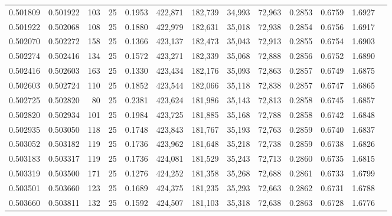 \begin{tabular}{rrrrrrrrrrrrr}
0.501809 & 0.501922 &   103 &  25 &                                     0.1953 & 422,871 & 182,739 &  34,993 &  72,963 & 0.2853 & 0.6759 & 1.6927 \\
0.501922 & 0.502068 &   108 &  25 &                                     0.1880 & 422,979 & 182,631 &  35,018 &  72,938 & 0.2854 & 0.6756 & 1.6917 \\
0.502070 & 0.502272 &   158 &  25 &                                     0.1366 & 423,137 & 182,473 &  35,043 &  72,913 & 0.2855 & 0.6754 & 1.6903 \\
0.502274 & 0.502416 &   134 &  25 &                                     0.1572 & 423,271 & 182,339 &  35,068 &  72,888 & 0.2856 & 0.6752 & 1.6890 \\
0.502416 & 0.502603 &   163 &  25 &                                     0.1330 & 423,434 & 182,176 &  35,093 &  72,863 & 0.2857 & 0.6749 & 1.6875 \\
0.502603 & 0.502724 &   110 &  25 &                                     0.1852 & 423,544 & 182,066 &  35,118 &  72,838 & 0.2857 & 0.6747 & 1.6865 \\
0.502725 & 0.502820 &    80 &  25 &                                     0.2381 & 423,624 & 181,986 &  35,143 &  72,813 & 0.2858 & 0.6745 & 1.6857 \\
0.502820 & 0.502934 &   101 &  25 &                                     0.1984 & 423,725 & 181,885 &  35,168 &  72,788 & 0.2858 & 0.6742 & 1.6848 \\
0.502935 & 0.503050 &   118 &  25 &                                     0.1748 & 423,843 & 181,767 &  35,193 &  72,763 & 0.2859 & 0.6740 & 1.6837 \\
0.503052 & 0.503182 &   119 &  25 &                                     0.1736 & 423,962 & 181,648 &  35,218 &  72,738 & 0.2859 & 0.6738 & 1.6826 \\
0.503183 & 0.503317 &   119 &  25 &                                     0.1736 & 424,081 & 181,529 &  35,243 &  72,713 & 0.2860 & 0.6735 & 1.6815 \\
0.503319 & 0.503500 &   171 &  25 &                                     0.1276 & 424,252 & 181,358 &  35,268 &  72,688 & 0.2861 & 0.6733 & 1.6799 \\
0.503501 & 0.503660 &   123 &  25 &                                     0.1689 & 424,375 & 181,235 &  35,293 &  72,663 & 0.2862 & 0.6731 & 1.6788 \\
0.503660 & 0.503811 &   132 &  25 &                                     0.1592 & 424,507 & 181,103 &  35,318 &  72,638 & 0.2863 & 0.6728 & 1.6776 \\

\end{tabular}
